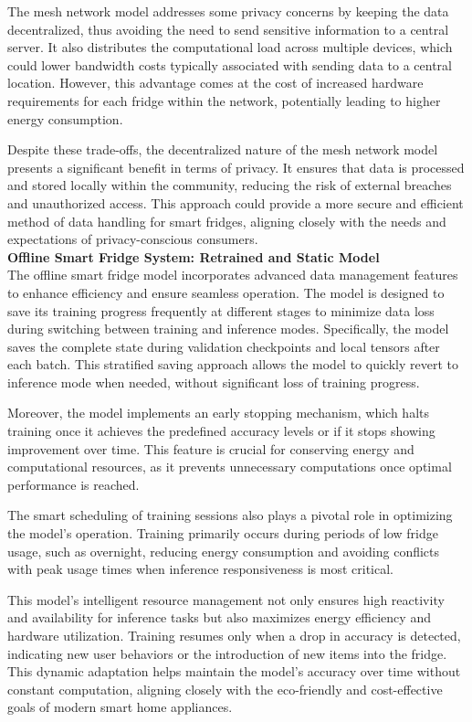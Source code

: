 \documentclass[runningheads]{llncs}
\begin{document}
The mesh network model addresses some privacy concerns by keeping the data decentralized, thus avoiding the need to send sensitive information to a central server. It also distributes the computational load across multiple devices, which could lower bandwidth costs typically associated with sending data to a central location. However, this advantage comes at the cost of increased hardware requirements for each fridge within the network, potentially leading to higher energy consumption.

Despite these trade-offs, the decentralized nature of the mesh network model presents a significant benefit in terms of privacy. It ensures that data is processed and stored locally within the community, reducing the risk of external breaches and unauthorized access. This approach could provide a more secure and efficient method of data handling for smart fridges, aligning closely with the needs and expectations of privacy-conscious consumers. \\

\noindent\textbf{Offline Smart Fridge System: Retrained and Static Model} \\
The offline smart fridge model incorporates advanced data management features to enhance efficiency and ensure seamless operation. The model is designed to save its training progress frequently at different stages to minimize data loss during switching between training and inference modes. Specifically, the model saves the complete state during validation checkpoints and local tensors after each batch. This stratified saving approach allows the model to quickly revert to inference mode when needed, without significant loss of training progress.

Moreover, the model implements an early stopping mechanism, which halts training once it achieves the predefined accuracy levels or if it stops showing improvement over time. This feature is crucial for conserving energy and computational resources, as it prevents unnecessary computations once optimal performance is reached. 

The smart scheduling of training sessions also plays a pivotal role in optimizing the model's operation. Training primarily occurs during periods of low fridge usage, such as overnight, reducing energy consumption and avoiding conflicts with peak usage times when inference responsiveness is most critical.

This model's intelligent resource management not only ensures high reactivity and availability for inference tasks but also maximizes energy efficiency and hardware utilization. Training resumes only when a drop in accuracy is detected, indicating new user behaviors or the introduction of new items into the fridge. This dynamic adaptation helps maintain the model's accuracy over time without constant computation, aligning closely with the eco-friendly and cost-effective goals of modern smart home appliances.



\end{document}
